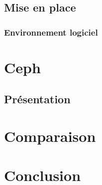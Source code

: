 \documentclass[12pt]{report}
\begin{document}
	\section{Mise en place}
		\subsection{Environnement logiciel}

		


	\chapter{Ceph}
		\section{Présentation}

	\chapter{Comparaison}

	\chapter{Conclusion}
\end{document}
